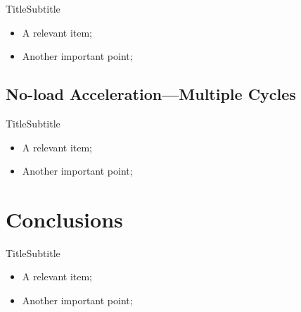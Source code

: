     \begin{frame}{Title}{Subtitle}\vspace*{-2em}
        \begin{itemize}
            \item<2->  A \alert{relevant} item;
            \item<3->  Another \alert{important} point;
        \end{itemize}
    \end{frame}

\subsection{No-load Acceleration---Multiple Cycles}

    \begin{frame}{Title}{Subtitle}\vspace*{-2em}
        \begin{itemize}
            \item<2->  A \alert{relevant} item;
            \item<3->  Another \alert{important} point;
        \end{itemize}
    \end{frame}

\section{Conclusions}

    \begin{frame}{Title}{Subtitle}\vspace*{-2em}
        \begin{itemize}
            \item<2->  A \alert{relevant} item;
            \item<3->  Another \alert{important} point;
        \end{itemize}
    \end{frame}

